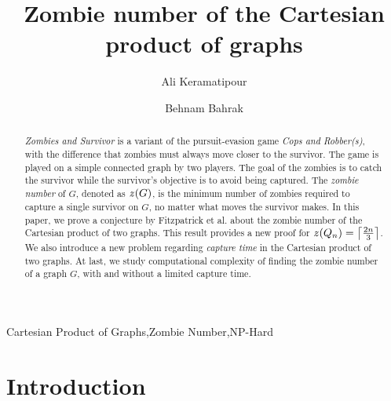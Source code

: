 \documentclass[1p]{elsarticle}
\DeclarePairedDelimiter\ceil{\lceil}{\rceil} \DeclarePairedDelimiter\floor{\lfloor}{\rfloor}
\newcommand{\zn}{\ooalign{$z$\cr\hfil\rule[.5ex]{.2em}{.08ex}\hfil\cr}}
\begin{document}
	
	\begin{frontmatter}
		
		\title{Zombie number of the Cartesian product of graphs}
		
		
		\author{Ali Keramatipour}
		
		\author{Behnam Bahrak}
		
		\address{School of Electrical and Computer Engineering, College of Engineering, University of Tehran, Tehran, Iran}
		
		\begin{abstract}
		{\it Zombies and Survivor} is a variant of the pursuit-evasion game {\it Cops and Robber(s)}, with the
		difference that zombies must always move closer to the survivor. The game is played on a simple connected graph
		by two players. The goal of the zombies is to catch the survivor while the survivor's objective is to avoid
		being captured. The {\it zombie number} of $G$, denoted as $\zn(G)$, is the minimum number of zombies required
		to capture a single survivor on $G$, no matter what moves the survivor makes. In this paper, we prove a
		conjecture by Fitzpatrick et al.\cite{Fitz16} about the zombie number of the Cartesian product of two graphs.
		This result provides a new proof for $\zn(Q_n) = \ceil*{\frac{2n}{3}}$. We also introduce a new problem
		regarding {\it capture time} in the Cartesian product of two graphs. At last, we study computational complexity
		of finding the zombie number of a graph $G$, with and without a limited capture time.
		\end{abstract}
		
		\begin{keyword}
			Cartesian Product of Graphs\sep Zombie Number\sep NP-Hard
		\end{keyword}
		
	\end{frontmatter}
	
\section{Introduction}\label{section-introduction}
\end{document}
